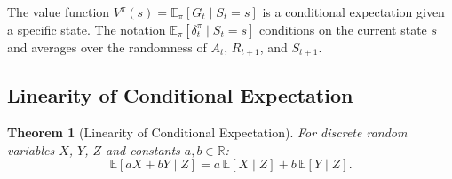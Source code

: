 \documentclass[11pt,a4paper]{article}
\theoremstyle{definition}
\theoremstyle{plain}
\newtheorem{theorem}{Theorem}[section]
\theoremstyle{remark}
\newcommand{\E}{\mathbb{E}}
\newcommand{\R}{\mathbb{R}}
\begin{document}
\begin{tdconnection}
The value function $V^\pi(s) = \E_\pi[G_t \mid S_t = s]$ is a conditional expectation given a specific state. The notation $\E_\pi[\delta_t^\pi \mid S_t = s]$ conditions on the current state $s$ and averages over the randomness of $A_t$, $R_{t+1}$, and $S_{t+1}$.
\end{tdconnection}

\subsection{Linearity of Conditional Expectation}
\label{subsec:cond_linearity}

\begin{theorem}[Linearity of Conditional Expectation]
\label{thm:cond_linearity}
For discrete random variables $X$, $Y$, $Z$ and constants $a, b \in \R$:
\begin{equation}
    \E[aX + bY \mid Z] = a\,\E[X \mid Z] + b\,\E[Y \mid Z].
    \label{eq:cond_linearity}
\end{equation}
\end{theorem}
\end{document}
